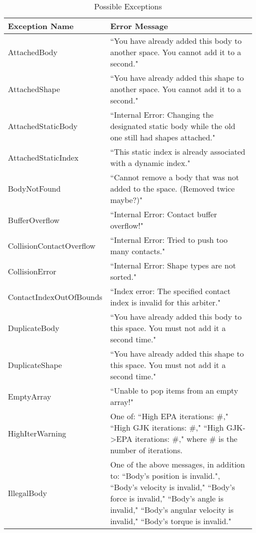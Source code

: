 \documentclass[12pt]{article}
\newcommand{\inquote}[1]{``{#1}"}
\begin{document}
\renewcommand{\thetable}{1}
\renewcommand{\arraystretch}{1.2}
\begin{longtable}{y x{11.6cm}} \caption{Possible Exceptions}\\
	\toprule \textbf{Exception Name} &
	\textbf{Error Message} \\ \midrule
	    AttachedBody & \inquote{You have already added this body to another space. You cannot add it to a second.} \\
	    AttachedShape & \inquote{You have already added this shape to another space. You cannot add it to a second.} \\
	    AttachedStaticBody & \inquote{Internal Error: Changing the designated static body while the old one still had shapes attached.} \\
	    AttachedStaticIndex & \inquote{This static index is already associated with a dynamic index.} \\
	    BodyNotFound & \inquote{Cannot remove a body that was not added to the space. (Removed twice maybe?)} \\
	    BufferOverflow & \inquote{Internal Error: Contact buffer overflow!} \\
	    CollisionContactOverflow & \inquote{Internal Error: Tried to push too many contacts.} \\
	    CollisionError & \inquote{Internal Error: Shape types are not sorted.} \\
	    ContactIndexOutOfBounds & \inquote{Index error: The specified contact index is invalid for this arbiter.} \\ 
	    DuplicateBody & \inquote{You have already added this body to this space. You must not add it a second time.} \\
	    DuplicateShape & \inquote{You have already added this shape to this space. You must not add it a second time.} \\
	    EmptyArray & \inquote{Unable to pop items from an empty array!} \\
	    HighIterWarning & One of: \inquote{High EPA iterations: \#,} \inquote{High GJK iterations: \#,} \inquote{High GJK-\textgreater EPA iterations: \#,} where \# is the number of iterations. \\
	    IllegalBody & One of the above messages, in addition to: \inquote{Body's position is invalid.}, \inquote{Body's velocity is invalid,} \inquote{Body's force is invalid,} \inquote{Body's angle is invalid,} \inquote{Body's angular velocity is invalid,} \inquote{Body's torque is invalid.} \\

\end{longtable}
\end{document}
